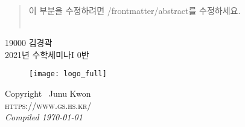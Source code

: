 \begin{abstract}
이 부분을 수정하려면 /frontmatter/abstract를 수정하세요.~\\\\
\end{abstract}
\begin{dedication2}
{\large{19000 김경곽}}\\[5mm]
2021년 수학세미나I 0반
\end{dedication2}
\begin{copyright2}
	
	\begin{figure}[h]
		\texttt{[image: logo\_full]}
	\end{figure}
	
	\noindent Copyright \textcopyright\the\year\ Junu Kwon \\ %
	
	\noindent \textsc{https://www.gs.hs.kr/}\\ %
	
	\noindent \textit{Compiled \today} 
	\if@openright\cleardoublepage\else\clearpage\fi
\end{copyright2}